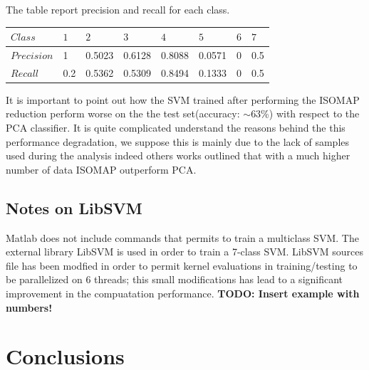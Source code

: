 \documentclass[a4paper,10pt]{article}
\begin{document}
      The table report precision and recall for each class.
      \begin{table}[H]
      	\centering
	\begin{tabular}{l|P{1cm}P{1cm}P{1cm}P{1cm}P{1cm}P{1cm}P{1cm}} \toprule
	  {$Class$} & {$1$} & {$2$} & {$3$} & {$4$} & {$5$} & {$6$} & {$7$} \\ \midrule
	  $Precision$  & 1 & 0.5023 & 0.6128 & 0.8088 & 0.0571 & 0 & 0.5 \\ \midrule
	  $Recall$  & 0.2 & 0.5362 & 0.5309 & 0.8494 & 0.1333 & 0 & 0.5 \\ \bottomrule
	\end{tabular}
      \end{table}
      \noindent It is important to point out how the SVM trained after performing the ISOMAP reduction perform worse on the 
      the test set(accuracy: $\sim$63\%) with respect to the PCA classifier.\newline
      It is quite complicated understand the reasons behind the this performance degradation, we suppose this is mainly due to 
      the lack of samples used during the analysis indeed others works \cite{sdssiso} outlined that with a much higher number of
      data ISOMAP outperform PCA.

  \subsection{Notes on LibSVM}
    Matlab does not include commands that permits to train a multiclass SVM. The external library LibSVM \cite{libsvm} is used in order
    to train a 7-class SVM. LibSVM sources file has been modfied \cite{openmpsvm} in order to permit kernel evaluations in training/testing
    to be parallelized on 6 threads; this small modifications has lead to a significant improvement in the compuatation performance.\newline
    \textbf{TODO: Insert example with numbers!}
    
\newpage

\section{Conclusions}

\newpage
\end{document}
